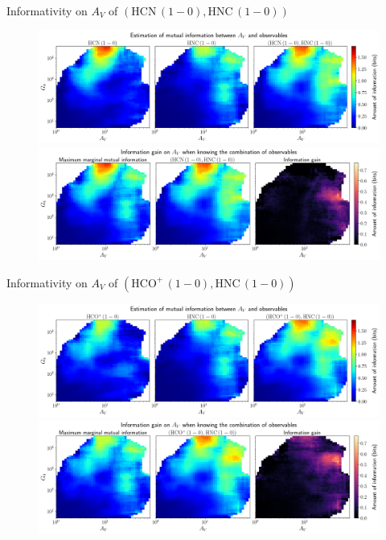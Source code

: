 \documentclass{beamer}
\begin{document}
\begin{frame}{Informativity on $A_V$ of $\left(\mathrm{HCN\,(1-0)},\mathrm{HNC\,(1-0)}\right)$}
    \begin{figure}
        \centering
        \includegraphics[width=0.95\linewidth]{../mi/av__hcn10_hnc10_mi.png}
        \vfill
        \includegraphics[width=0.95\linewidth]{../mi/av__hcn10_hnc10_mi_gain.png}
    \end{figure}
\end{frame}

\begin{frame}{Informativity on $A_V$ of $\left(\mathrm{HCO^+\,(1-0)},\mathrm{HNC\,(1-0)}\right)$}
    \begin{figure}
        \centering
        \includegraphics[width=0.95\linewidth]{../mi/av__hcop10_hnc10_mi.png}
        \vfill
        \includegraphics[width=0.95\linewidth]{../mi/av__hcop10_hnc10_mi_gain.png}
    \end{figure}
\end{frame}
\end{document}
